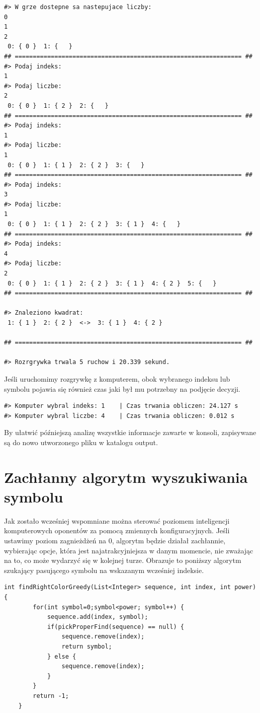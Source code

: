\documentclass[document]{xmgr}
\begin{document}
\begin{lstlisting}[frame=single]
#> W grze dostepne sa nastepujace liczby: 
0
1
2
 0: { 0 }  1: {   } 
## =============================================================== ##
#> Podaj indeks: 
1
#> Podaj liczbe: 
2
 0: { 0 }  1: { 2 }  2: {   } 
## =============================================================== ##
#> Podaj indeks: 
1
#> Podaj liczbe: 
1
 0: { 0 }  1: { 1 }  2: { 2 }  3: {   } 
## =============================================================== ##
#> Podaj indeks: 
3
#> Podaj liczbe: 
1
 0: { 0 }  1: { 1 }  2: { 2 }  3: { 1 }  4: {   } 
## =============================================================== ##
#> Podaj indeks: 
4
#> Podaj liczbe: 
2
 0: { 0 }  1: { 1 }  2: { 2 }  3: { 1 }  4: { 2 }  5: {   } 
## =============================================================== ##

#> Znaleziono kwadrat:  
 1: { 1 }  2: { 2 }  <->  3: { 1 }  4: { 2 } 

## =============================================================== ##

#> Rozrgrywka trwala 5 ruchow i 20.339 sekund.
\end{lstlisting}
Jeśli uruchomimy rozgrywkę z komputerem, obok wybranego indeksu lub symbolu pojawia się również czas jaki był mu potrzebny na podjęcie decyzji.

\begin{lstlisting}[frame=single]
#> Komputer wybral indeks: 1 	| Czas trwania obliczen: 24.127 s
#> Komputer wybral liczbe: 4 	| Czas trwania obliczen: 0.012 s\end{lstlisting}

By ułatwić późniejszą analizę wszystkie informacje zawarte w konsoli, zapisywane są do nowo utworzonego pliku w katalogu output.

\section{Zachłanny algorytm wyszukiwania symbolu}
Jak zostało wcześniej wspomniane można sterować poziomem inteligencji komputerowych oponentów za pomocą zmiennych konfiguracyjnych. Jeśli ustawimy poziom zagnieżdżeń na 0, algorytm będzie działał zachłannie, wybierając opcje, która jest najatrakcyjniejsza w danym momencie, nie zważając na to, co może wydarzyć się w kolejnej turze. Obrazuje to poniższy algorytm szukający pasującego symbolu na wskazanym wcześniej indeksie.

\begin{lstlisting}[frame=single]
int findRightColorGreedy(List<Integer> sequence, int index, int power) {
		for(int symbol=0;symbol<power; symbol++) {
			sequence.add(index, symbol);
			if(pickProperFind(sequence) == null) {
				sequence.remove(index);
				return symbol;
			} else {
				sequence.remove(index);
			}
		}
		return -1;
	}
\end{lstlisting}
\end{document}
